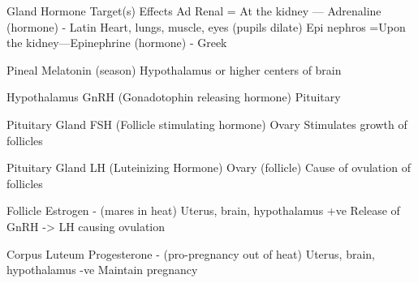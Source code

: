 
Gland 														Hormone																		Target(s)																				Effects	
Ad Renal = At the kidney --- 			Adrenaline (hormone) - Latin								Heart, lungs, muscle, eyes (pupils dilate)
Epi nephros =Upon the kidney---Epinephrine (hormone) - Greek 		

Pineal															Melatonin	 (season)													Hypothalamus or higher centers of brain

Hypothalamus 										GnRH (Gonadotophin releasing hormone)	Pituitary

Pituitary Gland										FSH (Follicle stimulating hormone)					Ovary 																					Stimulates growth of follicles

Pituitary Gland 										LH (Luteinizing Hormone)									Ovary (follicle)																	Cause of ovulation of follicles

Follicle														Estrogen	- (mares in heat)									Uterus, brain, hypothalamus	+ve							Release of GnRH -> LH causing ovulation

Corpus Luteum										Progesterone - (pro-pregnancy out of heat) Uterus, brain, hypothalamus -ve								Maintain pregnancy								


